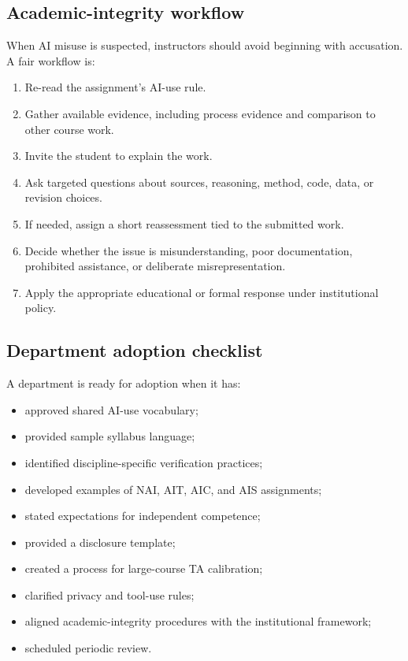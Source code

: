 \documentclass{SIAMbook2023}
\begin{document}
\subsection{Academic-integrity workflow}
\label{u:app:integrity-workflow}

When AI misuse is suspected, instructors should avoid beginning with accusation. A fair workflow is:

\begin{enumerate}
  \item Re-read the assignment's AI-use rule.
  \item Gather available evidence, including process evidence and comparison to other course work.
  \item Invite the student to explain the work.
  \item Ask targeted questions about sources, reasoning, method, code, data, or revision choices.
  \item If needed, assign a short reassessment tied to the submitted work.
  \item Decide whether the issue is misunderstanding, poor documentation, prohibited assistance, or deliberate misrepresentation.
  \item Apply the appropriate educational or formal response under institutional policy.
\end{enumerate}

\subsection{Department adoption checklist}
\label{u:app:department-checklist}

A department is ready for adoption when it has:

\begin{itemize}
  \item approved shared AI-use vocabulary;
  \item provided sample syllabus language;
  \item identified discipline-specific verification practices;
  \item developed examples of NAI, AIT, AIC, and AIS assignments;
  \item stated expectations for independent competence;
  \item provided a disclosure template;
  \item created a process for large-course TA calibration;
  \item clarified privacy and tool-use rules;
  \item aligned academic-integrity procedures with the institutional framework;
  \item scheduled periodic review.
\end{itemize}
\end{document}
